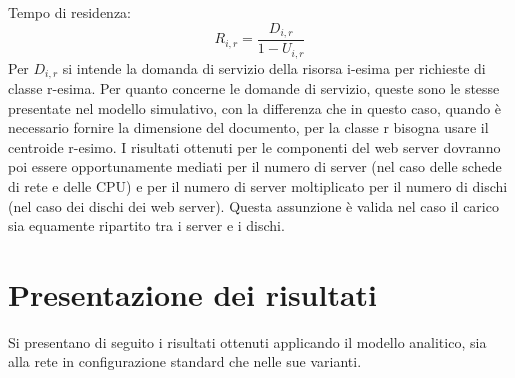 Tempo di residenza:
$$R_{i,r} = \frac{D_{i,r}}{1- U_{i,r}}$$
Per $D_{i,r}$ si intende la domanda di servizio della risorsa i-esima per richieste di classe r-esima. Per quanto concerne le domande di servizio, queste sono le stesse presentate nel modello simulativo, con la differenza che in questo caso, quando è necessario fornire la dimensione del documento, per la classe r bisogna usare il centroide r-esimo. I risultati ottenuti per le componenti del web server dovranno poi essere opportunamente mediati per il numero di server (nel caso delle schede di rete e delle CPU) e per il numero di server moltiplicato per il numero di dischi (nel caso dei dischi dei web server). Questa assunzione è valida nel caso il carico sia equamente ripartito tra i server e i dischi.
\section{Presentazione dei risultati}
Si presentano di seguito i risultati ottenuti applicando il modello analitico, sia alla rete in configurazione standard che nelle sue varianti.
